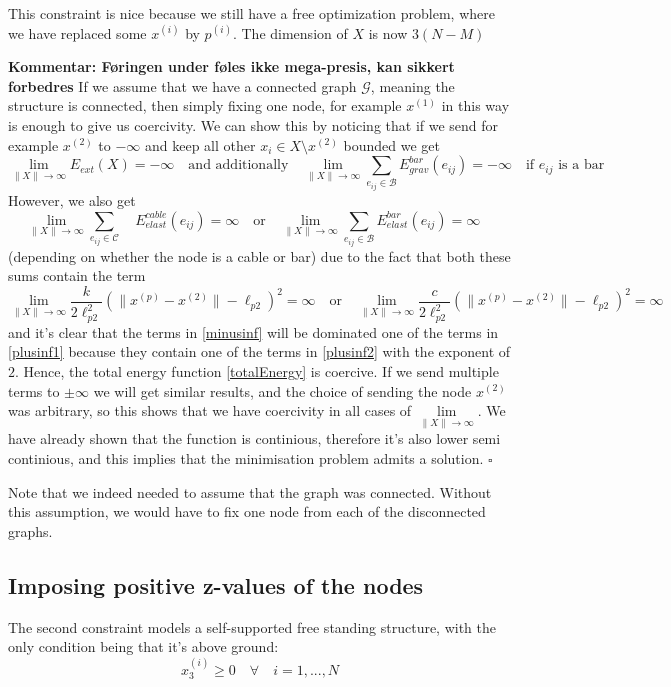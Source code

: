\documentclass[11pt]{article}
\newcommand{\sumset}[1]{\sum\limits_{e_{ij} \in \mathcal{#1}}}
\newcommand{\ebe}{E^{bar}_{elast}(e_{ij})}
\newcommand{\ebg}{E^{bar}_{grav}(e_{ij})}
\newcommand{\ece}{E^{cable}_{elast}(e_{ij})}
\newcommand{\ee}{E_{ext}(X)}
\newcommand{\xinf}{\lim\limits_{\rVert X \lVert \to \infty}}
\begin{document}
This constraint is nice because we still have a free optimization problem, where we have replaced some $x^{(i)}$ by $p^{(i)}$. The dimension of $X$ is now $3(N-M)$

\textbf{Kommentar: Føringen under føles ikke mega-presis, kan sikkert forbedres}
If we assume that we have a connected graph $\mathcal{G}$, meaning the structure is connected, then simply fixing one node, for example $x^{(1)}$ in this way is enough to give us coercivity. We can show this by noticing that if we send for example $x^{(2)}$ to $-\infty$ and keep all other $x_i \in X \setminus x^{(2)}$ bounded we get
\begin{equation}
  \xinf \ee = -\infty
\quad\text{and additionally}\quad
\xinf \sumset{B} \ebg = -\infty \quad \text{if $e_{ij}$ is a bar}
\label{minusinf}
\end{equation}
However, we also get
\begin{equation}
     \xinf \sumset{C}\quad \ece = \infty \quad \text{or}\quad \xinf \sumset{B }\ebe = \infty \quad
     \label{plusinf1}
\end{equation} (depending on whether the node is a cable or bar)
due to the fact that both these sums contain the term \begin{equation}
 \xinf \frac{k}{2 \ell_{p2}^2}(\lVert x^{(p)} - x^{(2)} \rVert-\ell_{p2})^2 = \infty \quad \text{or} \quad \xinf \frac{c}{2 \ell_{p2}^2}(\lVert x^{(p)} - x^{(2)} \rVert-\ell_{p2})^2 = \infty
 \label{plusinf2}
\end{equation}
and it's clear that the terms in \eqref{minusinf} will be dominated one of the terms in \eqref{plusinf1} because they contain one of the terms in \eqref{plusinf2} with the exponent of $2$. Hence, the total energy function \eqref{totalEnergy} is coercive. If we send multiple terms to $\pm \infty$ we will get similar results, and the choice of sending the node $x^{(2)}$ was arbitrary, so this shows that we have coercivity in all cases of $\xinf$. We have already shown that the function is continious, therefore it's also lower semi continious, and this implies that the minimisation problem admits a solution. $\square$

Note that we indeed needed to assume that the graph was connected. Without this assumption, we would have to fix one node from each of the disconnected graphs. 

\subsection{Imposing positive z-values of the nodes}
The second constraint models a self-supported free standing structure, with the only condition being that it's above ground:
\begin{equation}
    x_3^{(i)} \geq 0 \quad \forall \quad i = 1,...,N
\end{equation}
\end{document}

